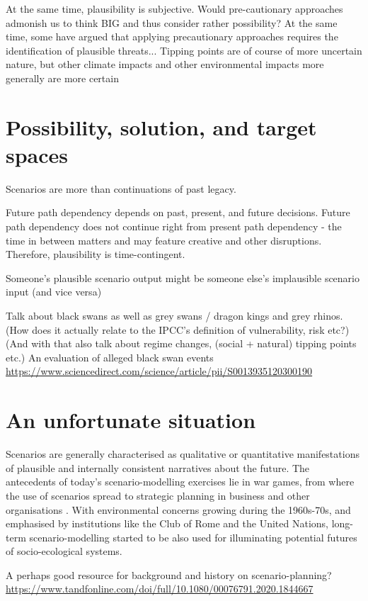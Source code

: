 \documentclass{article}
\begin{document}
\begin{refsection}
At the same time, plausibility is subjective. Would pre-cautionary approaches admonish us to think BIG and thus consider rather possibility?
At the same time, some have argued that applying precautionary approaches requires the identification of plausible threats...
Tipping points are of course of more uncertain nature, but other climate impacts and other environmental impacts more generally are more certain

\section{Possibility, solution, and target spaces}

Scenarios are more than continuations of past legacy.

Future path dependency depends on past, present, and future decisions. Future path dependency does not continue right from present path dependency - the time in between matters and may feature creative and other disruptions. Therefore, plausibility is time-contingent.

Someone's plausible scenario output might be someone else's implausible scenario input (and vice versa)

Talk about black swans as well as grey swans / dragon kings and grey rhinos. (How does it actually relate to the IPCC's definition of vulnerability, risk etc?)
(And with that also talk about regime changes, (social + natural) tipping points etc.)
An evaluation of alleged black swan events \url{https://www.sciencedirect.com/science/article/pii/S0013935120300190}

\label{main_part}
\section{An unfortunate situation}

Scenarios are generally characterised as qualitative or quantitative manifestations of plausible and internally consistent narratives about the future. The antecedents of today's scenario-modelling exercises lie in war games, from where the use of scenarios spread to strategic planning in business and other organisations \parencite{bradfield_2005,schoemaker_1993}.\footnotemark{} With environmental concerns growing during the 1960s-70s, and emphasised by institutions like the Club of Rome and the United Nations, long-term scenario-modelling started to be also used for illuminating potential futures of socio-ecological systems.

A perhaps good resource for background and history on scenario-planning? \url{https://www.tandfonline.com/doi/full/10.1080/00076791.2020.1844667}


\end{refsection}
\end{document}
